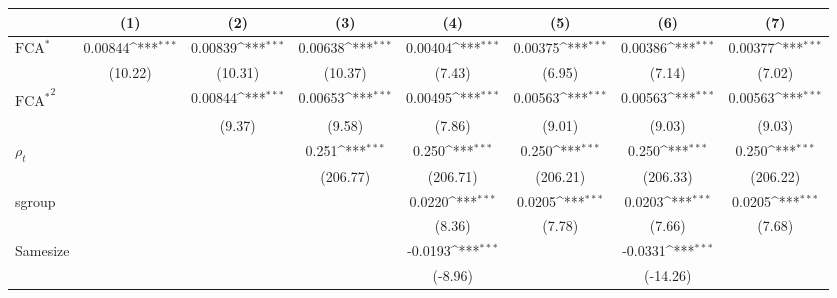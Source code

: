 {
\def\sym#1{\ifmmode^{#1}\else\(^{#1}\)\fi}
\begin{tabular}{l*{7}{c}}
\hline\hline
                    &\multicolumn{1}{c}{(1)}         &\multicolumn{1}{c}{(2)}         &\multicolumn{1}{c}{(3)}         &\multicolumn{1}{c}{(4)}         &\multicolumn{1}{c}{(5)}         &\multicolumn{1}{c}{(6)}         &\multicolumn{1}{c}{(7)}         \\
\hline
$ \text{FCA}^* $    &     0.00844\sym{***}&     0.00839\sym{***}&     0.00638\sym{***}&     0.00404\sym{***}&     0.00375\sym{***}&     0.00386\sym{***}&     0.00377\sym{***}\\
                    &     (10.22)         &     (10.31)         &     (10.37)         &      (7.43)         &      (6.95)         &      (7.14)         &      (7.02)         \\
[1em]
 $ { \text{FCA} ^ * } ^2 $&                     &     0.00844\sym{***}&     0.00653\sym{***}&     0.00495\sym{***}&     0.00563\sym{***}&     0.00563\sym{***}&     0.00563\sym{***}\\
                    &                     &      (9.37)         &      (9.58)         &      (7.86)         &      (9.01)         &      (9.03)         &      (9.03)         \\
[1em]
$ \rho_t $          &                     &                     &       0.251\sym{***}&       0.250\sym{***}&       0.250\sym{***}&       0.250\sym{***}&       0.250\sym{***}\\
                    &                     &                     &    (206.77)         &    (206.71)         &    (206.21)         &    (206.33)         &    (206.22)         \\
[1em]
sgroup              &                     &                     &                     &      0.0220\sym{***}&      0.0205\sym{***}&      0.0203\sym{***}&      0.0205\sym{***}\\
                    &                     &                     &                     &      (8.36)         &      (7.78)         &      (7.66)         &      (7.68)         \\
[1em]
Samesize            &                     &                     &                     &     -0.0193\sym{***}&                     &     -0.0331\sym{***}&                     \\
                    &                     &                     &                     &     (-8.96)         &                     &    (-14.26)         &                     \\

\end{tabular}}
